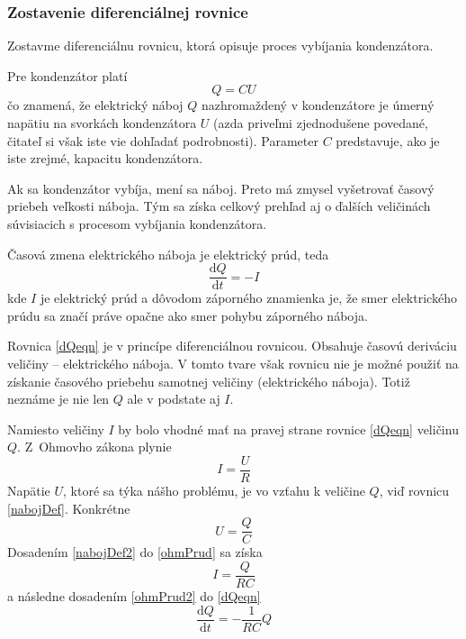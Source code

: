 \documentclass[a4paper, 10pt, ]{article}
\begin{document}
\subsubsection{Zostavenie diferenciálnej rovnice}

Zostavme diferenciálnu rovnicu, ktorá opisuje proces vybíjania kondenzátora.


Pre kondenzátor platí
\begin{equation} \label{nabojDef}
    Q = CU
\end{equation}
čo znamená, že elektrický náboj $Q$ nazhromaždený v kondenzátore je úmerný napätiu na svorkách kondenzátora $U$ (azda priveľmi zjednodušene povedané, čitateľ si však iste vie dohľadať podrobnosti). Parameter $C$ predstavuje, ako je iste zrejmé, kapacitu kondenzátora.

Ak sa kondenzátor vybíja, mení sa náboj. Preto má zmysel vyšetrovať časový priebeh veľkosti náboja. Tým sa získa celkový prehľad aj o ďalších veličinách súvisiacich s procesom vybíjania kondenzátora.

Časová zmena elektrického náboja je elektrický prúd, teda
\begin{equation} \label{dQeqn}
    \frac{\text{d}Q}{\text{d}t} = - I
\end{equation}
kde $I$ je elektrický prúd a dôvodom záporného znamienka je, že smer elektrického prúdu sa značí práve opačne ako smer pohybu záporného náboja.

Rovnica \eqref{dQeqn} je v princípe diferenciálnou rovnicou. Obsahuje časovú deriváciu veličiny -- elektrického náboja. V tomto tvare však rovnicu nie je možné použiť na získanie časového priebehu samotnej veličiny (elektrického náboja). Totiž neznáme je nie len $Q$ ale v podstate aj $I$.



\bigskip

Namiesto veličiny $I$ by bolo vhodné mať na pravej strane rovnice \eqref{dQeqn} veličinu $Q$. Z~Ohmovho zákona plynie
\begin{equation} \label{ohmPrud}
    I = \frac{U}{R}
\end{equation}
Napätie $U$, ktoré sa týka nášho problému, je vo vzťahu k veličine $Q$, viď rovnicu  \eqref{nabojDef}. Konkrétne
\begin{equation} \label{nabojDef2}
    U = \frac{Q}{C}
\end{equation}
Dosadením \eqref{nabojDef2} do \eqref{ohmPrud} sa získa
\begin{equation} \label{ohmPrud2}
    I = \frac{Q}{RC}
\end{equation}
a následne dosadením \eqref{ohmPrud2} do \eqref{dQeqn}
\begin{equation} \label{diffRalpha}
    \frac{\text{d}Q}{\text{d}t} = - \frac{1}{RC} Q
\end{equation}
\end{document}
